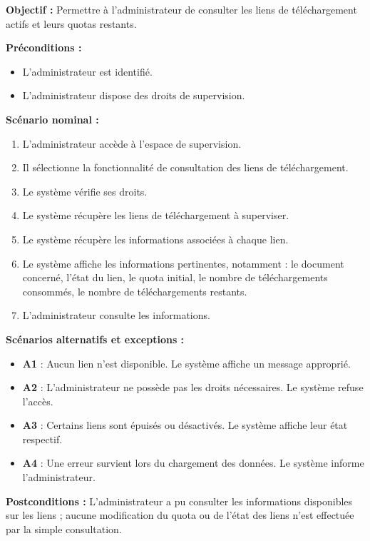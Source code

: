 \begin{description}[leftmargin=0pt, style=nextline, font=\normalfont\bfseries\color{violetprincipal}]
    \textbf{Objectif :} Permettre à l'administrateur de consulter les liens de téléchargement actifs et leurs quotas restants.

    \textbf{Préconditions :}
    \begin{itemize}
        \item L'administrateur est identifié.
        \item L'administrateur dispose des droits de supervision.
    \end{itemize}

    \textbf{Scénario nominal :}
    \begin{enumerate}
        \item L'administrateur accède à l'espace de supervision.
        \item Il sélectionne la fonctionnalité de consultation des liens de téléchargement.
        \item Le système vérifie ses droits.
        \item Le système récupère les liens de téléchargement à superviser.
        \item Le système récupère les informations associées à chaque lien.
        \item Le système affiche les informations pertinentes, notamment : le document concerné, l'état du lien, le quota initial, le nombre de téléchargements consommés, le nombre de téléchargements restants.
        \item L'administrateur consulte les informations.
    \end{enumerate}

    \textbf{Scénarios alternatifs et exceptions :}
    \begin{itemize}
        \item \textbf{A1} : Aucun lien n'est disponible. Le système affiche un message approprié.
        \item \textbf{A2} : L'administrateur ne possède pas les droits nécessaires. Le système refuse l'accès.
        \item \textbf{A3} : Certains liens sont épuisés ou désactivés. Le système affiche leur état respectif.
        \item \textbf{A4} : Une erreur survient lors du chargement des données. Le système informe l'administrateur.
    \end{itemize}

    \textbf{Postconditions :} L'administrateur a pu consulter les informations disponibles sur les liens ; aucune modification du quota ou de l'état des liens n'est effectuée par la simple consultation.


\end{description}
